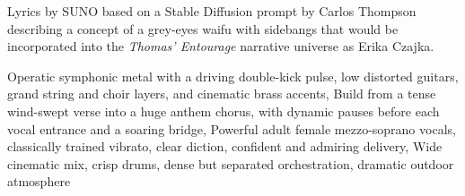 
\begin{notes}
Lyrics by SUNO based on a Stable Diffusion prompt by Carlos Thompson describing a concept of a grey-eyes waifu with sidebangs %
that would be incorporated into the \emph{Thomas’ Entourage} narrative universe as Erika Czajka.
\end{notes}
\begin{style}
Operatic symphonic metal with a driving double-kick pulse, low distorted guitars, grand string and choir layers, and cinematic brass accents, Build from a tense wind-swept verse into a huge anthem chorus, with dynamic pauses before each vocal entrance and a soaring bridge, Powerful adult female mezzo-soprano vocals, classically trained vibrato, clear diction, confident and admiring delivery, Wide cinematic mix, crisp drums, dense but separated orchestration, dramatic outdoor atmosphere
\end{style}
